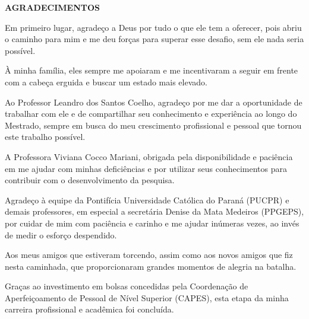 \begin{center}
    \textbf{AGRADECIMENTOS}
\end{center}

Em primeiro lugar, agradeço a Deus por tudo o que ele tem a oferecer, pois abriu o caminho para mim e me deu forças para superar esse desafio, sem ele nada seria possível.

À minha família, eles sempre me apoiaram e me incentivaram a seguir em frente com a cabeça erguida e buscar um estado mais elevado.

Ao Professor Leandro dos Santos Coelho, agradeço por me dar a oportunidade de trabalhar com ele e de compartilhar seu conhecimento e experiência ao longo do Mestrado, sempre em busca do meu crescimento profissional e pessoal que tornou este trabalho possível.

A Professora Viviana Cocco Mariani, obrigada pela disponibilidade e paciência em me ajudar com minhas deficiências e por utilizar seus conhecimentos para contribuir com o desenvolvimento da pesquisa.

Agradeço à equipe da Pontifícia Universidade Católica do Paraná (PUCPR) e demais professores, em especial a secretária Denise da Mata Medeiros (PPGEPS), por cuidar de mim com paciência e carinho e me ajudar inúmeras vezes, ao invés de medir o esforço despendido.

Aos meus amigos que estiveram torcendo, assim como aos novos amigos que fiz nesta caminhada, que proporcionaram grandes momentos de alegria na batalha.

Graças ao investimento em bolsas concedidas pela Coordenação de Aperfeiçoamento de Pessoal de Nível Superior (CAPES), esta etapa da minha carreira profissional e acadêmica foi concluída.